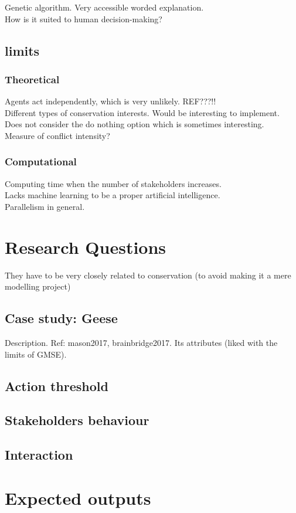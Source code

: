 \documentclass[12pt,a4paper]{article}
\begin{document}
Genetic algorithm. Very accessible worded explanation.\\
How is it suited to human decision-making?

\subsection{limits}

\subsubsection{Theoretical}

Agents act independently, which is very unlikely. REF???!!\\
Different types of conservation interests.
Would be interesting to implement.\\
Does not consider the do nothing option which is sometimes interesting.\\
Measure of conflict intensity?

\subsubsection{Computational}
Computing time when the number of stakeholders increases.\\
Lacks machine learning to be a proper artificial intelligence.\\
Parallelism in general.

\section{Research Questions}

They have to be very closely related to conservation (to avoid making it a mere modelling project)

\subsection{Case study: Geese}

Description. Ref: mason2017, brainbridge2017.
Its attributes (liked with the limits of GMSE). 

\subsection{Action threshold}

\subsection{Stakeholders behaviour}

\subsection{Interaction}

\section{Expected outputs}
\end{document}
